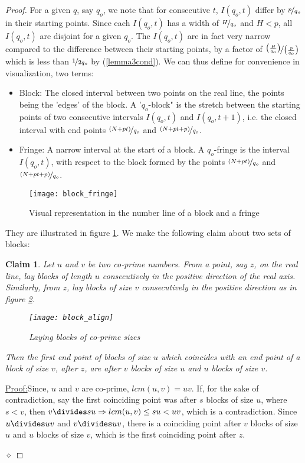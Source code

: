 \documentclass{report}
\newtheorem*{claim*}{Claim}
\newenvironment{claimproof}[1]{\vspace{2.5mm}\par\noindent\underline{Proof:}\space#1}{\hfill $\diamond$ \vspace{2.5mm} \par}
\begin{document}
\begin{proof}
For a given $q$, say $q_o$, we note that for consecutive $t$, $I(q_o,t)$ differ by $\nicefrac{p}{q_o}$ in their starting points. Since each $I(q_o,t)$ has a width of $\nicefrac{H}{q_o}$ and $H<p$, all $I(q_o,t)$ are disjoint for a given $q_o$. The $I(q_o,t)$ are in fact very narrow compared to the difference between their starting points, by a factor of $\nicefrac{\big(\frac{H}{q_o}\big)}{\big(\frac{p}{q_o}}\big)$ which is less than $\nicefrac{1}{2q_o}$ by (\ref{lemma3cond}). We can thus define for convenience in visualization, two terms:
\begin{itemize}
    \item Block: The closed interval between two points on the real line, the points being the 'edges' of the block. A '$q_o$-block" is the stretch between the starting points of two consecutive intervals $I(q_o,t)$ and $I(q_o,t+1)$, i.e. the closed interval with end points $\nicefrac{(N+pt)}{q_o}$ and $\nicefrac{(N+pt+p)}{q_o}$.
    \item Fringe: A narrow interval at the start of a block. A $q_o$-fringe is the interval $I(q_o,t)$, with respect to the block formed by the points $\nicefrac{(N+pt)}{q_o}$ and $\nicefrac{(N+pt+p)}{q_o}$.
\end{itemize}
\begin{figure}
\texttt{[image: block\_fringe]}
\centering
\caption{Visual representation in the number line of a block and a fringe}
\label{fig:block_fringe}
\end{figure}
They are illustrated in figure \ref{fig:block_fringe}. We make the following claim about two sets of blocks:
%
\begin{claim*}
  Let $u$ and $v$ be two co-prime numbers. From a point, say $z$, on the real line, lay blocks of length $u$ consecutively in the positive direction of the real axis. Similarly, from $z$, lay blocks of size $v$ consecutively in the positive direction as in figure \ref{fig:block_align}.
  \begin{figure}
  \texttt{[image: block\_align]}
  \centering
  \caption{Laying blocks of co-prime sizes}
  \label{fig:block_align}
  \end{figure}
  Then the first end point of blocks of size $u$ which coincides with an end point of a block of size $v$, after $z$, are after $v$ blocks of size $u$ and $u$ blocks of size $v$.
\end{claim*}
\begin{claimproof}
  Since, $u$ and $v$ are co-prime, $lcm(u,v)=uv$. If, for the sake of contradiction, say the first coinciding point was after $s$ blocks of size $u$, where $s<v$, then $v \divides su\Rightarrow lcm(u,v) \leq su < uv$, which is a contradiction. Since $u\divides uv$ and $v \divides uv$, there is a coinciding point after $v$ blocks of size $u$ and $u$ blocks of size $v$, which is the first coinciding point after $z$.

\end{claimproof}
\end{proof}
\end{document}
